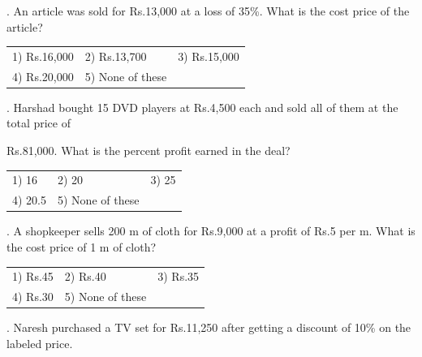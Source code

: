 \documentclass{article}
\begin{document}
	\noindent 
	
	.   An article was sold for Rs.13,000 at a loss of 35\%. What is the cost price of the article?
	
	\noindent 
	
	\noindent  
	\begin{tabular}{p{1.7in} p{1.6in} p{1.6in}} \\ 
 1) Rs.16,000                         & 2) Rs.13,700     & 3) Rs.15,000    \\
  4) Rs.20,000     & 5) None of these  \\
\end{tabular}
	
	\noindent 
	
	\noindent 
	
	\noindent 
	
	.   Harshad bought 15 DVD players at Rs.4,500 each and sold all of them at the total price of
	
	\noindent 
	
	\noindent Rs.81,000. What is the percent profit earned in the deal?
	
	\noindent 


	
	\noindent  
	\begin{tabular}{p{1.7in} p{1.6in} p{1.6in}} \\ 
 1) 16                        & 2) 20                 & 3) 25                 \\
4) 20.5              & 5) None of these  \\
\end{tabular}
	
	\noindent 
	
	\noindent 
	
	\noindent 
	
	.   A shopkeeper sells 200 m of cloth for Rs.9,000 at a profit of Rs.5 per m. What is the cost price of 1 m of cloth?
	
	\noindent  
	\begin{tabular}{p{1.7in} p{1.6in} p{1.6in}} \\ 
 1) Rs.45                   & 2) Rs.40            & 3) Rs.35            \\
4) Rs.30            & 5) None of these  \\
\end{tabular}
	
	\noindent 
	
	\noindent 
	
	.   Naresh purchased a TV set for Rs.11,250 after getting a discount of 10\% on the labeled price.
	
\end{document}
